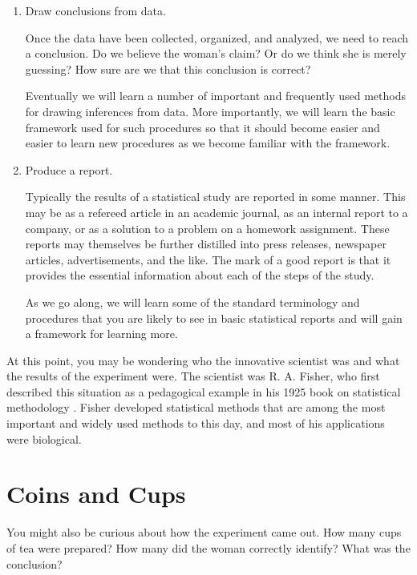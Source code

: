 \documentclass[twoside]{book}\usepackage[]{graphicx}\usepackage[]{xcolor}
\def\myindex#1{\index{#1}}
\newcounter{example}[section]
\begin{document}
\begin{enumerate}
  \item Draw conclusions from data.

	Once the data have been collected, organized, and analyzed, we need
	to reach a conclusion.  
	Do we believe the woman's claim?  
	Or do we think she is merely guessing?  How sure are we that this
	conclusion is correct?

	Eventually we will
	learn a number of important and frequently used methods for 
	drawing inferences from data.  More importantly, we will learn
	the basic framework used for such procedures so that it should 
	become easier and easier to learn new procedures as we become 
	familiar with the framework.
	

  \item Produce a report.

		Typically the results of a statistical study are reported in 
		some manner.  This may be as a refereed article in an academic 
		journal, as an internal report to a company, or as a solution
		to a problem on a homework assignment.  These reports may themselves
		be further distilled into press releases, newspaper articles,
		advertisements, and the like.  The mark of a good report
		is that it provides the essential information about each 
		of the steps of the study.

		As we go along, we will learn some of the standard terminology and
		procedures that you are likely to see in basic statistical reports and 
		will gain a framework for learning more.  
\end{enumerate}

At this point, you may be wondering who the innovative scientist was and 
what the results of the experiment were.
\myindex{Fisher, R. A.}%
The scientist was R. A. Fisher, who first described this situation
as a pedagogical example in his 1925 book on 
statistical methodology \cite{Fisher:1925:Methods}.
Fisher developed statistical methods that are among the most
important and widely used methods to this day, and most of his 
applications were biological.
\nocite{Fisher:1970:Methods}%


\section{Coins and Cups}
You might also be curious about how the experiment came out.
How many cups of tea were prepared?  How many did the woman 
correctly identify?  What was the conclusion?
\end{document}
